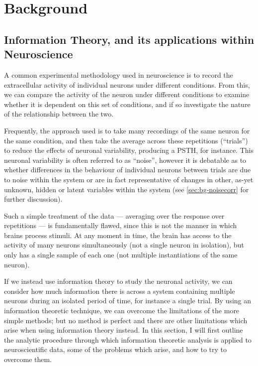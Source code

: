 
\chapter{Background}
\label{ch:bg}

\section{Information Theory, and its applications within Neuroscience}
\label{sec:bgit}

A common experimental methodology used in neuroscience is to record the extracellular activity of individual neurons under different conditions.
From this, we can compare the activity of the neuron under different conditions to examine whether it is dependent on this set of conditions, and if so investigate the nature of the relationship between the two.

Frequently, the approach used is to take many recordings of the same neuron for the same condition, and then take the average across these repetitions (``trials'') to reduce the effects of neuronal variability, producing a \ac{PSTH}, for instance.
This neuronal variability is often referred to as ``noise'', however it is debatable as to whether differences in the behaviour of individual neurons between trials are due to noise within the system or are in fact representative of changes in other, as-yet unknown, hidden or latent variables within the system (see \ref{sec:bg-noisecorr} for further discussion).

Such a simple treatment of the data --- averaging over the response over repetitions --- is fundamentally flawed, since this is not the manner in which brains process stimuli.
At any moment in time, the brain has access to the activity of many neurons simultaneously (not a single neuron in isolation), but only has a single sample of each one (not multiple instantiations of the same neuron).

If we instead use information theory to study the neuronal activity, we can consider how much information there is across a system containing multiple neurons during an isolated period of time, for instance a single trial.
By using an information theoretic technique, we can overcome the limitations of the more simple methods; but no method is perfect and there are other limitations which arise when using information theory instead.
In this section, I will first outline the analytic procedure through which information theoretic analysis is applied to neuroscientific data, some of the problems which arise, and how to try to overcome them.


